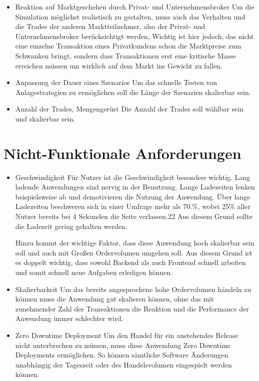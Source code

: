 \begin{itemize}
		\item Reaktion auf Marktgeschehen durch Privat- und Unternehmensbroker
			Um die Simulation möglichst realistisch zu gestalten, muss auch das Verhalten und die Trades der anderen Marktteilnehmer, also der Privat- und Unternehmensbroker berücksichtigt werden, Wichtig ist hier jedoch, das nicht eine einzelne Transaktion eines Privatkundens schon die Marktpreise zum Schwanken bringt, sondern dass Transaktionen erst eine kritische Masse erreichen müssen um wirklich auf dem Markt ins Gewicht zu fallen. 
			
		\item Anpassung der Dauer eines Szenarios
			Um das schnelle Testen von Anlagestrategien zu ermöglichen soll die Länge der Szenarien skalierbar sein. 
			
		\item Anzahl der Trades, Mengengerüst
			Die Anzahl der Trades soll wählbar sein und skalierbar sein. 
	\end{itemize}
\section{Nicht-Funktionale Anforderungen}
		\begin{itemize}
		\item Geschwindigkeit
			Für Nutzer ist die Geschwindigkeit besonders wichtig. Lang ladende Anwendungen
			sind nervig in der Benutzung. Lange Ladezeiten lenken beispielsweise
			ab und demotivieren die Nutzung der Anwendung. Über lange Ladezeiten
			beschweren sich in einer Umfrage mehr als 70.\%, wobei 25\% aller Nutzer bereits bei 4
			Sekunden die Seite verlassen.22 Aus diesem Grund sollte die Ladezeit gering gehalten
			werden. %
			
			Hinzu kommt der wichtige Faktor, dass diese Anwendung hoch skalierbar sein soll und auch mit Großen Ordervolumen umgehen soll. Aus diesem Grund ist es doppelt wichtig, dass sowohl Backend als auch Frontend schnell arbeiten und somit schnell neue Aufgaben erledigen können.
			
		\item Skalierbarkeit
			Um das bereits angesprochene hohe Ordervolumen händeln zu können muss die Anwendung gut skalieren können, ohne das mit zunehmender Zahl der Transaktionen die Reaktion und die Performance der Anwendung immer schlechter wird. 
			
		\item Zero Downtime Deployment
			Um den Handel für ein anstehendes Release nicht unterbrechen zu müssen, muss diese Anwendung Zero Downtime Deployments ermöglichen. So können sämtliche Software Änderungen unabhängig der Tageszeit oder des Handelsvolumen eingespielt werden können. 
	\end{itemize}
